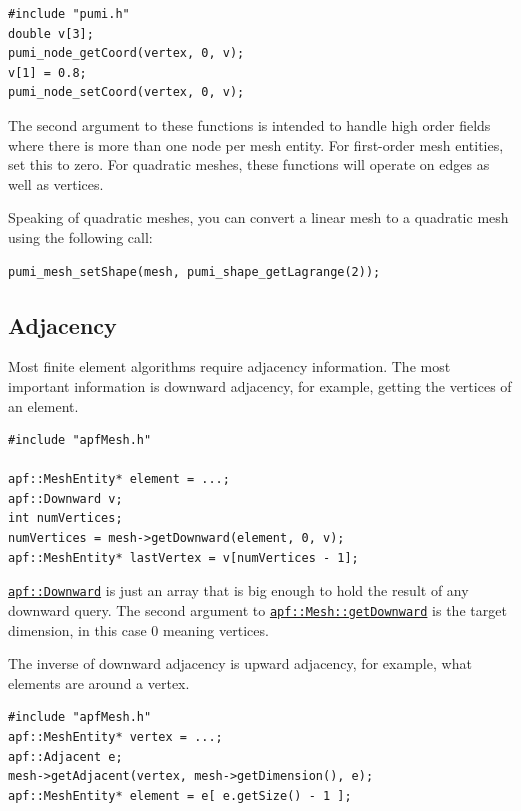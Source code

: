 \documentclass{article}
\begin{document}
{\begin{lstlisting}
#include "pumi.h"
double v[3];
pumi_node_getCoord(vertex, 0, v);
v[1] = 0.8;
pumi_node_setCoord(vertex, 0, v);
\end{lstlisting}

The second argument to these functions is intended to handle
high order fields where there is more than one node
per mesh entity.
For first-order mesh entities, set this to zero.
For quadratic meshes, these functions will operate on edges as well as vertices.

Speaking of quadratic meshes, you can convert a linear mesh
to a quadratic mesh using the following call:

\begin{lstlisting}
pumi_mesh_setShape(mesh, pumi_shape_getLagrange(2));
\end{lstlisting}

\subsection{Adjacency}

Most finite element algorithms require adjacency information.
The most important information is downward adjacency, for
example, getting the vertices of an element.

\begin{lstlisting}
#include "apfMesh.h"

apf::MeshEntity* element = ...;
apf::Downward v;
int numVertices;
numVertices = mesh->getDownward(element, 0, v);
apf::MeshEntity* lastVertex = v[numVertices - 1];
\end{lstlisting}

\href{http://scorec.rpi.edu/~dibanez/core/namespaceapf.html#a041eedcdfef4c64dafb2936219978328}{\texttt{apf::Downward}}
is just an array that is big enough to hold the result of any downward
query.
The second argument to
\href{http://scorec.rpi.edu/~dibanez/core/classapf_1_1Mesh.html#ae9af2075129ffd4553092049d85b276b}{\texttt{apf::Mesh::getDownward}}
is the target dimension, in this case 0 meaning vertices.

The inverse of downward adjacency is upward adjacency,
for example, what elements are around a vertex.

\begin{lstlisting}
#include "apfMesh.h"
apf::MeshEntity* vertex = ...;
apf::Adjacent e;
mesh->getAdjacent(vertex, mesh->getDimension(), e);
apf::MeshEntity* element = e[ e.getSize() - 1 ];
\end{lstlisting}

}
\end{document}

